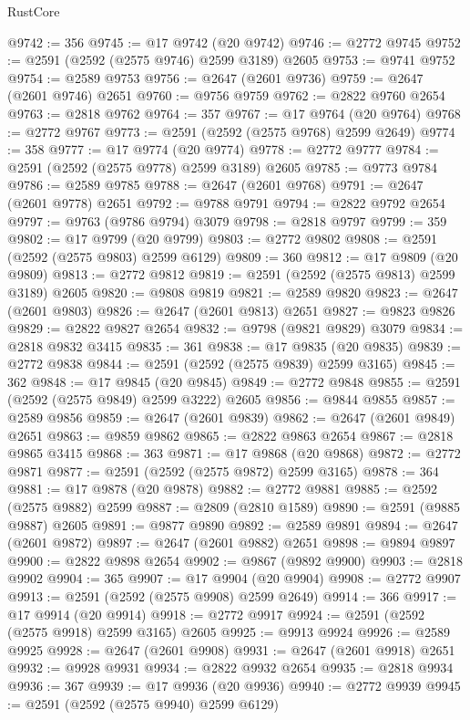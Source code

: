 \begin{lexlean}{RustCore}
\begin{coremodule}
@9742 := 356
@9745 := @17 @9742 (@20 @9742)
@9746 := @2772 @9745
@9752 := @2591 (@2592 (@2575 @9746) @2599 @3189) @2605
@9753 := @9741 @9752
@9754 := @2589 @9753
@9756 := @2647 (@2601 @9736)
@9759 := @2647 (@2601 @9746) @2651
@9760 := @9756 @9759
@9762 := @2822 @9760 @2654
@9763 := @2818 @9762
@9764 := 357
@9767 := @17 @9764 (@20 @9764)
@9768 := @2772 @9767
@9773 := @2591 (@2592 (@2575 @9768) @2599 @2649)
@9774 := 358
@9777 := @17 @9774 (@20 @9774)
@9778 := @2772 @9777
@9784 := @2591 (@2592 (@2575 @9778) @2599 @3189) @2605
@9785 := @9773 @9784
@9786 := @2589 @9785
@9788 := @2647 (@2601 @9768)
@9791 := @2647 (@2601 @9778) @2651
@9792 := @9788 @9791
@9794 := @2822 @9792 @2654
@9797 := @9763 (@9786 @9794) @3079
@9798 := @2818 @9797
@9799 := 359
@9802 := @17 @9799 (@20 @9799)
@9803 := @2772 @9802
@9808 := @2591 (@2592 (@2575 @9803) @2599 @6129)
@9809 := 360
@9812 := @17 @9809 (@20 @9809)
@9813 := @2772 @9812
@9819 := @2591 (@2592 (@2575 @9813) @2599 @3189) @2605
@9820 := @9808 @9819
@9821 := @2589 @9820
@9823 := @2647 (@2601 @9803)
@9826 := @2647 (@2601 @9813) @2651
@9827 := @9823 @9826
@9829 := @2822 @9827 @2654
@9832 := @9798 (@9821 @9829) @3079
@9834 := @2818 @9832 @3415
@9835 := 361
@9838 := @17 @9835 (@20 @9835)
@9839 := @2772 @9838
@9844 := @2591 (@2592 (@2575 @9839) @2599 @3165)
@9845 := 362
@9848 := @17 @9845 (@20 @9845)
@9849 := @2772 @9848
@9855 := @2591 (@2592 (@2575 @9849) @2599 @3222) @2605
@9856 := @9844 @9855
@9857 := @2589 @9856
@9859 := @2647 (@2601 @9839)
@9862 := @2647 (@2601 @9849) @2651
@9863 := @9859 @9862
@9865 := @2822 @9863 @2654
@9867 := @2818 @9865 @3415
@9868 := 363
@9871 := @17 @9868 (@20 @9868)
@9872 := @2772 @9871
@9877 := @2591 (@2592 (@2575 @9872) @2599 @3165)
@9878 := 364
@9881 := @17 @9878 (@20 @9878)
@9882 := @2772 @9881
@9885 := @2592 (@2575 @9882) @2599
@9887 := @2809 (@2810 @1589)
@9890 := @2591 (@9885 @9887) @2605
@9891 := @9877 @9890
@9892 := @2589 @9891
@9894 := @2647 (@2601 @9872)
@9897 := @2647 (@2601 @9882) @2651
@9898 := @9894 @9897
@9900 := @2822 @9898 @2654
@9902 := @9867 (@9892 @9900)
@9903 := @2818 @9902
@9904 := 365
@9907 := @17 @9904 (@20 @9904)
@9908 := @2772 @9907
@9913 := @2591 (@2592 (@2575 @9908) @2599 @2649)
@9914 := 366
@9917 := @17 @9914 (@20 @9914)
@9918 := @2772 @9917
@9924 := @2591 (@2592 (@2575 @9918) @2599 @3165) @2605
@9925 := @9913 @9924
@9926 := @2589 @9925
@9928 := @2647 (@2601 @9908)
@9931 := @2647 (@2601 @9918) @2651
@9932 := @9928 @9931
@9934 := @2822 @9932 @2654
@9935 := @2818 @9934
@9936 := 367
@9939 := @17 @9936 (@20 @9936)
@9940 := @2772 @9939
@9945 := @2591 (@2592 (@2575 @9940) @2599 @6129)

\end{coremodule}
\end{lexlean}

